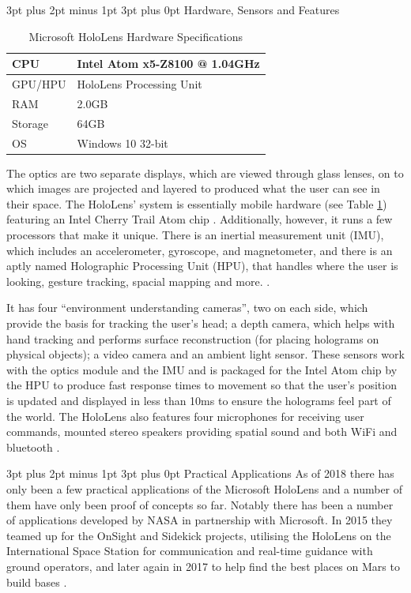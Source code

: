 \documentclass[12pt,a4paper,oneside]{article}
\makeatletter
\renewcommand\subsubsection{\@startsection {subsubsection}{1}{0mm} %
	                           {3pt plus 2pt minus 1pt} %
	                           {3pt plus 0pt} %
	                           {\normalfont\bfseries}}
\makeatother
\begin{document}
\subsubsection{Hardware, Sensors and Features}
\begin{table}[!h]
	\renewcommand{\arraystretch}{1.3}
	\caption{Microsoft HoloLens Hardware Specifications}
	\label{hardware}
	\centering
	\begin{tabular}{l|l}
		\toprule
		CPU & Intel Atom x5-Z8100 @ 1.04GHz\\ \hline
		GPU/HPU & HoloLens Processing Unit \\ \hline
		RAM & 2.0GB\\ \hline
		Storage & 64GB\\ \hline
		OS & Windows 10 32-bit\\ \bottomrule
	\end{tabular}
\end{table}
The optics are two separate displays, which are viewed through glass lenses, on to which images are projected and layered to produced what the user can see in their space. The HoloLens' system is essentially mobile hardware (see Table \ref{hardware}) featuring an Intel Cherry Trail Atom chip \cite{rubino16}. Additionally, however, it runs a few processors that make it unique. There is an inertial measurement unit (IMU), which includes an accelerometer, gyroscope, and magnetometer, and there is an aptly named Holographic Processing Unit (HPU), that handles where the user is looking, gesture tracking, spacial mapping and more. \cite{holmdahl15}.

It has four ``environment understanding cameras'', two on each side, which provide the basis for tracking the user's head; a depth camera, which helps with hand tracking and performs surface reconstruction (for placing holograms on physical objects); a video camera and an ambient light sensor. These sensors work with the optics module and the IMU and is packaged for the Intel Atom chip by the HPU to produce fast response times to movement so that the user's position is updated and displayed in less than 10ms to ensure the holograms feel part of the world. The HoloLens also features four microphones for receiving user commands, mounted stereo speakers providing spatial sound and both WiFi and bluetooth \cite{colaner16}.

\subsubsection{Practical Applications}
As of 2018 there has only been a few practical applications of the Microsoft HoloLens and a number of them have only been proof of concepts so far. Notably there has been a number of applications developed by NASA in partnership with Microsoft. In 2015 they teamed up for the OnSight and Sidekick projects, utilising the HoloLens on the International Space Station for communication and real-time guidance with ground operators, and later again in 2017 to help find the best places on Mars to build bases \cite{nasa15, microsoftnews17}.
\end{document}
